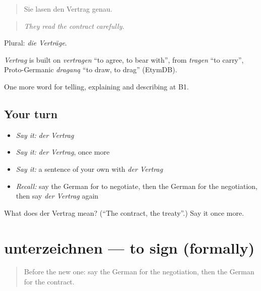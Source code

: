 \begin{quote}
Sie lasen den Vertrag genau.
\end{quote}

\begin{quote}
\emph{They read the contract carefully.}
\end{quote}

Plural: \emph{die Verträge}.

\begin{cousinweb}
\emph{Vertrag} is built on \emph{vertragen} \textquotedblleft{}to agree, to bear with\textquotedblright{}, from \emph{tragen} \textquotedblleft{}to carry\textquotedblright{}, Proto-Germanic \emph{draganą} \textquotedblleft{}to draw, to drag\textquotedblright{} (EtymDB).
\end{cousinweb}

\begin{grammarlens}[title={What you've built}]
One more word for telling, explaining and describing at B1.
\end{grammarlens}

\subsection*{Your turn}
\begin{itemize}
\raggedright
  \item \emph{Say it:} \emph{der Vertrag}
  \item \emph{Say it:} \emph{der Vertrag}, once more
  \item \emph{Say it:} a sentence of your own with \emph{der Vertrag}
  \item \emph{Recall:} say the German for to negotiate, then the German for the negotiation, then say \emph{der Vertrag} again
\end{itemize}

\begin{tcolorbox}[breakable,colback=teal!4,colframe=teal!35!black,title={Before you move on}]
What does der Vertrag mean? (\textquotedblleft{}The contract, the treaty\textquotedblright{}.) Say it once more.
\end{tcolorbox}
\section[unterzeichnen]{unterzeichnen — to sign (formally)}

\label{lesson:GE-C278-unterzeichnen}



\begin{quote}
Before the new one: say the German for the negotiation, then the German for the contract.
\end{quote}

